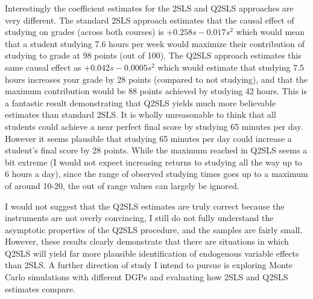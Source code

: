 \documentclass[12pt]{article}
\begin{document}
Interestingly the coefficient estimates for the 2SLS and Q2SLS approaches are very different. The standard 2SLS approach estimates that the causal effect of studying on grades (across both courses) is $+0.258s - 0.017s^2$ which would mean that a student studying 7.6 hours per week would maximize their contribution of studying to grade at 98 points (out of 100). The Q2SLS approach estimates this same causal effect as $+0.042s - 0.0005s^2$ which would estimate that studying 7.5 hours increases your grade by 28 points (compared to not studying), and that the maximum contribution would be 88 points achieved by studying 42 hours. This is a fantastic result demonstrating that Q2SLS yields much more believable estimates than standard 2SLS. It is wholly unreasonable to think that all students could achieve a near perfect final score by studying 65 minutes per day.  However it seems plausible that studying 65 minutes per day could increase a student's final score by 28 points. While the maximum reached in Q2SLS seems a bit extreme (I would not expect increasing returns to studying all the way up to 6 hours a day), since the range of observed studying times goes up to a maximum of around 10-20, the out of range values can largely be ignored. 

I would not suggest that the Q2SLS estimates are truly correct because the instruments are not overly convincing, I still do not fully understand the asymptotic properties of the Q2SLS procedure, and the samples are fairly small. However, these results clearly demonstrate that there are situations in which Q2SLS will yield far more plausible identification of endogenous variable effects than 2SLS. A further direction of study I intend to pursue is exploring Monte Carlo simulations with different DGPs and evaluating how 2SLS and Q2SLS estimates compare.

\newpage
\end{document}
